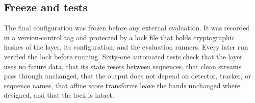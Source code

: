 \subsection{Freeze and tests}\label{sec:freeze}
The final configuration was frozen before any external evaluation. It was
recorded in a version-control tag and protected by a lock file that holds
cryptographic hashes of the layer, its configuration, and the evaluation
runners. Every later run verified the lock before running. Sixty-one automated
tests check that the layer uses no future data, that its state resets between
sequences, that clean streams pass through unchanged, that the output does not
depend on detector, tracker, or sequence names, that affine score transforms
leave the bands unchanged where designed, and that the lock is intact.
